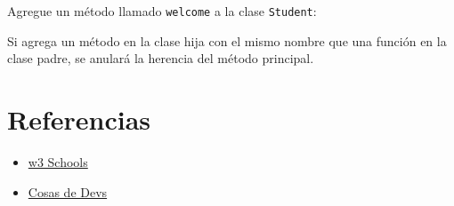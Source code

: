 \begin{code}
Agregue un método llamado \texttt{welcome} a la clase \texttt{Student}:

\begin{Shaded}
\begin{Highlighting}[]
   \NormalTok{(}
    \OperatorTok{=}

  \NormalTok{):}
    \NormalTok{(}\NormalTok{, }\NormalTok{, }
\end{Highlighting}
\end{Shaded}
\end{code}

Si agrega un método en la clase hija con el mismo nombre que una función
en la clase padre, se anulará la herencia del método principal.





\section{Referencias}

\begin{itemize}
\tightlist
\item
  \href{https://www.w3schools.com/python/python_classes.asp}{w3 Schools}
\item
  \href{https://cosasdedevs.com/posts/metodos-clase-metodos-estaticos-python/\#:~:text=M\%C3\%A9todos\%20de\%20clase\%20en\%20Python&text=Para\%20crear\%20un\%20m\%C3\%A9todo\%20de,cls\%20que\%20viene\%20de\%20class.}{Cosas
  de Devs}
\end{itemize}

